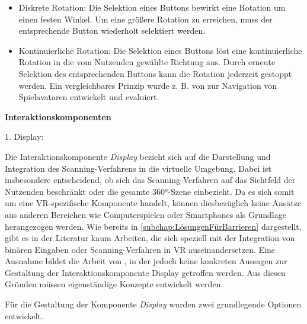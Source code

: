 \begin{itemize}
    \item Diskrete Rotation: Die Selektion eines Buttons bewirkt eine Rotation um einen festen Winkel. Um eine größere Rotation zu erreichen, muss der entsprechende Button wiederholt selektiert werden.
    \item Kontinuierliche Rotation: Die Selektion eines Buttons löst eine kontinuierliche Rotation in die vom Nutzenden gewählte Richtung aus. Durch erneute Selektion des entsprechenden Buttons kann die Rotation jederzeit gestoppt werden. Ein vergleichbares Prinzip wurde z. B. von \citet{10.1145/2159365.2159386} zur Navigation von Spielavataren entwickelt und evaluiert. 
\end{itemize}

{\normalfont \bfseries Interaktionskomponenten}  

1. Display:

Die Interaktionskomponente \textit{Display} bezieht sich auf die Darstellung und Integration des Scanning-Verfahrens in die virtuelle Umgebung. Dabei ist insbesondere entscheidend, ob sich das Scanning-Verfahren auf das Sichtfeld der Nutzenden beschränkt oder die gesamte 360°-Szene einbezieht. Da es sich somit um eine VR-spezifische Komponente handelt, können diesbezüglich keine Ansätze aus anderen Bereichen wie Computerspielen oder Smartphones als Grundlage herangezogen werden. Wie bereits in \autoref{subchap:LösungenFürBarrieren} dargestellt, gibt es in der Literatur kaum Arbeiten, die sich speziell mit der Integration von binären Eingaben oder Scanning-Verfahren in VR auseinandersetzen. Eine Ausnahme bildet die Arbeit von \citet{valakou_framework_2024}, in der jedoch keine konkreten Aussagen zur Gestaltung der Interaktionskomponente Display getroffen werden. Aus diesen Gründen müssen eigenständige Konzepte entwickelt werden.

Für die Gestaltung der Komponente \textit{Display} wurden zwei grundlegende Optionen entwickelt.


